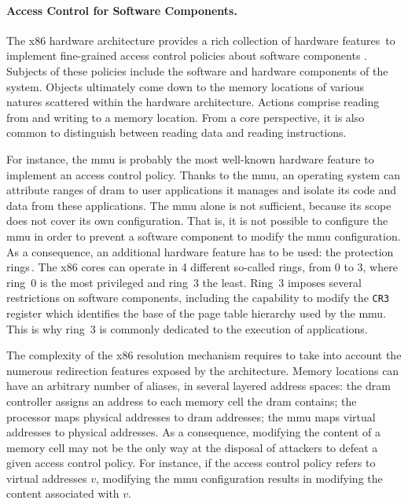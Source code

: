 \paragraph{Access Control for Software Components.}
%
The x86 hardware architecture provides a rich collection of hardware
features\,\cite[Volume 3]{intel2014manual} to implement fine-grained access
control policies about software components \IOs.
%
Subjects of these policies include the software and hardware components of the
system.
%
Objects ultimately come down to the memory locations of various natures
scattered within the hardware architecture.
%
Actions comprise reading from and writing to a memory location. From a core
perspective, it is also common to distinguish between reading data and reading
instructions.

For instance, the \ac{mmu} is probably the most well-known hardware feature to
implement an access control policy.
%
Thanks to the \ac{mmu}, an operating system can attribute ranges of \ac{dram} to
user applications it manages and isolate its code and data from these
applications.
%
The \ac{mmu} alone is not sufficient, because its scope does not cover its own
configuration.
%
That is, it is not possible to configure the \ac{mmu} in order to prevent a
software component to modify the \ac{mmu} configuration.
%
As a consequence, an additional hardware feature has to be used: the protection
rings\,\cite[Volume 3, Section 5.5]{intel2014manual}.
%
The x86 cores can operate in 4 different so-called rings, from 0 to 3, where
ring~0 is the most privileged and ring~3 the least.
%
Ring~3 imposes several restrictions on software components, including the
capability to modify the \texttt{CR3} register which identifies the base of the
page table hierarchy used by the \ac{mmu}.
%
This is why ring~3 is commonly dedicated to the execution of applications.

%
%

The complexity of the x86 \IO resolution mechanism requires to take into account
the numerous redirection features exposed by the architecture.
%
Memory locations can have an arbitrary number of aliases, in several layered
address spaces: the \ac{dram} controller assigns an address to each memory cell
the \ac{dram} contains; the processor maps physical addresses to \ac{dram}
addresses; the \ac{mmu} maps virtual addresses to physical addresses.
%
As a consequence, modifying the content of a memory cell may not be the only way
at the disposal of attackers to defeat a given access control policy.
%
For instance, if the access control policy refers to virtual addresses \( v \),
modifying the \ac{mmu} configuration results in modifying the content associated
with \( v \).

